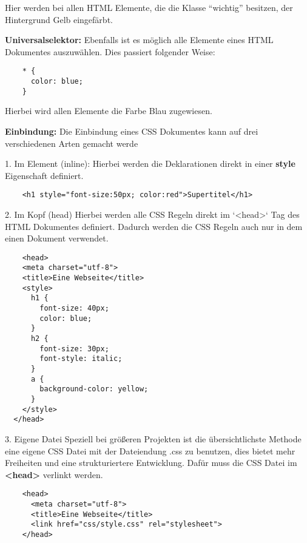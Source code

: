 Hier werden bei allen HTML Elemente, die die Klasse “wichtig” besitzen, der Hintergrund Gelb eingefärbt.

\textbf{Universalselektor:}
\newline
Ebenfalls ist es möglich alle Elemente eines HTML Dokumentes auszuwählen. Dies passiert folgender Weise:

\begin{lstlisting}
    * {
      color: blue;
    }
\end{lstlisting}

Hierbei wird allen Elemente die Farbe Blau zugewiesen.

\textbf{Einbindung:}
\newline
Die Einbindung eines CSS Dokumentes kann auf drei verschiedenen Arten gemacht werde

1. Im Element (inline):
\newline
Hierbei werden die Deklarationen direkt in einer \textbf{style} Eigenschaft definiert.

\begin{lstlisting}
    <h1 style="font-size:50px; color:red">Supertitel</h1>
\end{lstlisting}

2. Im Kopf (head)
\newline
Hierbei werden alle CSS Regeln direkt im `<head>` Tag des HTML Dokumentes definiert. Dadurch werden die CSS Regeln auch nur in dem einen Dokument verwendet.

\begin{lstlisting}
    <head>
    <meta charset="utf-8">
    <title>Eine Webseite</title>
    <style>
      h1 {
        font-size: 40px;
        color: blue;
      }
      h2 {
        font-size: 30px;
        font-style: italic;
      }
      a {
        background-color: yellow;
      }
    </style>
  </head>
\end{lstlisting}

3. Eigene Datei
\newline
Speziell bei größeren Projekten ist die übersichtlichste Methode eine eigene CSS Datei mit der Dateiendung .css zu benutzen, dies bietet mehr Freiheiten und eine strukturiertere Entwicklung. Dafür muss die CSS Datei im \textbf{<head>} verlinkt werden.

\begin{lstlisting}
    <head>
      <meta charset="utf-8">
      <title>Eine Webseite</title>
      <link href="css/style.css" rel="stylesheet">
    </head>
\end{lstlisting}

\cite{frontend_web_css}


